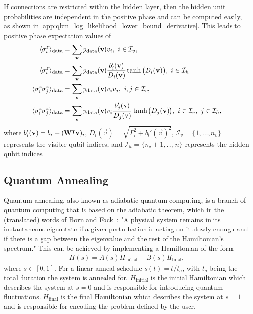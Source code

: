 If connections are restricted within the hidden layer, then the hidden unit probabilities are independent in the positive phase and can be computed easily, as shown in \cref{app:qbm_log_likelihood_lower_bound_derivative}.
This leads to positive phase expectation values of
\begin{align}
\begin{split}
    \langle \sigma_i^z \rangle_\text{data}
        &= \sum_{\mathbf{v}} p_{\text{data}}(\mathbf{v}) v_i,
        \ i \in \mathcal{I}_v, \\
    \langle \sigma_i^z \rangle_\text{data}
        &= \sum_{\mathbf{v}} p_{\text{data}}(\mathbf{v}) \frac{b_i'(\mathbf{v})}{D_i(\mathbf{v})} \tanh\big(D_i(\mathbf{v})\big), \ i \in \mathcal{I}_h, \\
    \langle \sigma_i^z \sigma_j^z \rangle_\text{data}
        &= \sum_{\mathbf{v}} p_{\text{data}}(\mathbf{v}) v_i v_j,
        \ i, j \in \mathcal{I}_v, \\
    \langle \sigma_i^z \sigma_j^z \rangle_\text{data}
        &= \sum_{\mathbf{v}} p_{\text{data}}(\mathbf{v}) v_i \frac{b_j'(\mathbf{v})}{D_j(\mathbf{v})} \tanh\big(D_j(\mathbf{v})\big), \ i \in \mathcal{I}_v, \ j \in \mathcal{I}_h,
\end{split}
\end{align}
where \( b_i'(\mathbf{v}) = b_i + (\mathbf{W}^\intercal\mathbf{v})_i \), \( D_i(\vec{v}) = \sqrt{\Gamma_i^2 + b_i'(\vec{v})^2} \), \( \mathcal{I}_v = \{1, \dots, n_v\} \) represents the visible qubit indices, and \( \mathcal{I}_h = \{n_v + 1, \dots, n\} \) represents the hidden qubit indices.

\subsection{Quantum Annealing}\label{sec:quantum_annealing}
Quantum annealing, also known as adiabatic quantum computing, is a branch of quantum computing that is based on the adiabatic theorem, which in the (translated) words of Born and Fock~\cite{born_fock_1928}:
"A physical system remains in its instantaneous eigenstate if a given perturbation is acting on it slowly enough and if there is a gap between the eigenvalue and the rest of the Hamiltonian's spectrum."
This can be achieved by implementing a Hamiltonian of the form~\cite{qc_lecture_notes}
\begin{align}
    H(s) = A(s) H_{\text{initial}} + B(s) H_{\text{final}},
\end{align}
where \( s \in [0, 1] \).
For a linear anneal schedule \( s(t) = t / t_a \), with \( t_a \) being the total duration the system is annealed for.
\( H_{\text{initial}} \) is the initial Hamiltonian which describes the system at \( s = 0 \) and is responsible for introducing quantum fluctuations.
\( H_{\text{final}} \) is the final Hamiltonian which describes the system at \( s = 1 \) and is responsible for encoding the problem defined by the user.

